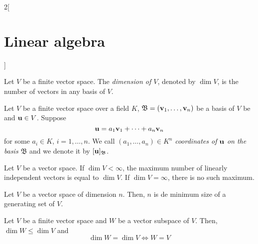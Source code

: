 \documentclass[../../../main.tex]{subfiles}
\begin{document}
\begin{multicols}{2}[\section{Linear algebra}]
  \begin{definition}
    Let $V$ be a finite vector space. The \textit{dimension of $V$}, denoted by $\dim V$, is the number of vectors in any basis of $V$.
  \end{definition}
  \begin{definition}
    Let $V$ be a finite vector space over a field $K$, $\mathfrak{B}=(\vb{v}_1,\ldots,\vb{v}_n)$ be a basis of $V$ be and $\vb{u}\in V$. Suppose $$\vb{u}=a_1\vb{v}_1+\cdots+a_n\vb{v}_n$$ for some $a_i\in K$, $i=1,\ldots,n$. We call $(a_1,\ldots,a_n)\in K^n$ \textit{coordinates of $\vb{u}$ on the basis $\mathfrak{B}$} and we denote it by $[\vb{u}]_{\mathfrak{B}}$.
  \end{definition}
  \begin{prop}
    Let $V$ be a vector space. If $\dim V<\infty$, the maximum number of linearly independent vectors is equal to $\dim V$. If $\dim V=\infty$, there is no such maximum.
  \end{prop}
  \begin{prop}
    Let $V$ be a vector space of dimension $n$. Then, $n$ is de minimum size of a generating set of $V$.
  \end{prop}
  \begin{prop}
    Let $V$ be a finite vector space and $W$ be a vector subspace of $V$. Then, $\dim W\leq\dim V$ and $$\dim W=\dim V\iff W=V$$
  \end{prop}

\end{multicols}
\end{document}
